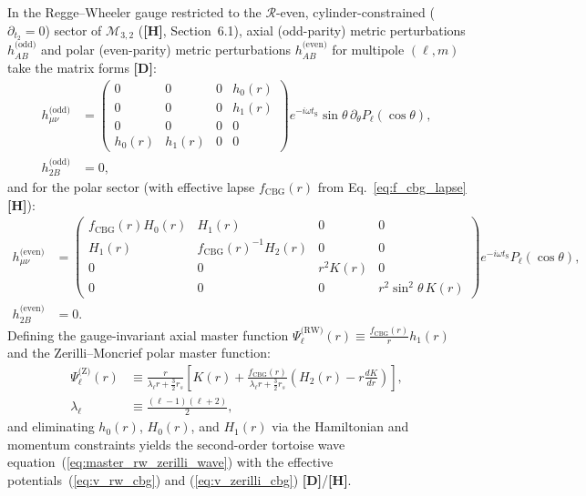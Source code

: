 \documentclass[11pt,a4paper]{article}
\newcommand{\catD}{\textbf{\textcolor{blue!75!black}{[D]}}}
\newcommand{\catH}{\textbf{\textcolor{orange!85!black}{[H]}}}
\theoremstyle{plain}
\theoremstyle{definition}
\theoremstyle{remark}
\numberwithin{equation}{section}
\begin{document}
In the Regge--Wheeler gauge \cite{regge1957,zerilli1970} restricted to the $\mathcal{R}$-even, cylinder-constrained ($\partial_{t_2} = 0$) sector of $\mathcal{M}_{3,2}$ (\catH, Section~6.1), axial (odd-parity) metric perturbations $h_{AB}^{\text{(odd)}}$ and polar (even-parity) metric perturbations $h_{AB}^{\text{(even)}}$ for multipole $(\ell, m)$ take the matrix forms \catD:
\begin{align}
h_{\mu\nu}^{\text{(odd)}} &= \begin{pmatrix}
0 & 0 & 0 & h_0(r) \\
0 & 0 & 0 & h_1(r) \\
0 & 0 & 0 & 0 \\
h_0(r) & h_1(r) & 0 & 0
\end{pmatrix} e^{-i\omega t_{\text{S}}} \sin\theta\,\partial_\theta P_\ell(\cos\theta), \nonumber \\[3pt]
h_{2B}^{\text{(odd)}} &= 0,
\label{eq:app_odd_matrix}
\end{align}
and for the polar sector (with effective lapse $f_{\text{CBG}}(r)$ from Eq.~\ref{eq:f_cbg_lapse} \catH):
\begin{align}
h_{\mu\nu}^{\text{(even)}} &= \begin{pmatrix}
f_{\text{CBG}}(r) H_0(r) & H_1(r) & 0 & 0 \\
H_1(r) & f_{\text{CBG}}(r)^{-1} H_2(r) & 0 & 0 \\
0 & 0 & r^2 K(r) & 0 \\
0 & 0 & 0 & r^2\sin^2\theta\,K(r)
\end{pmatrix} e^{-i\omega t_{\text{S}}} P_\ell(\cos\theta), \nonumber \\[3pt]
h_{2B}^{\text{(even)}} &= 0.
\label{eq:app_even_matrix}
\end{align}
Defining the gauge-invariant axial master function $\Psi_{\ell}^{\text{(RW)}}(r) \equiv \frac{f_{\text{CBG}}(r)}{r} h_1(r)$ and the Zerilli--Moncrief polar master function:
\begin{align}
\Psi_{\ell}^{\text{(Z)}}(r) &\equiv \frac{r}{\lambda_{\ell} r + \frac{3}{2}r_s} \left[ K(r) + \frac{f_{\text{CBG}}(r)}{\lambda_{\ell} r + \frac{3}{2}r_s} \left( H_2(r) - r\frac{dK}{dr} \right) \right], \nonumber \\[3pt]
\lambda_{\ell} &\equiv \frac{(\ell-1)(\ell+2)}{2},
\label{eq:app_zerilli_moncrief}
\end{align}
and eliminating $h_0(r)$, $H_0(r)$, and $H_1(r)$ via the Hamiltonian and momentum constraints yields the second-order tortoise wave equation~(\ref{eq:master_rw_zerilli_wave}) with the effective potentials~(\ref{eq:v_rw_cbg}) and (\ref{eq:v_zerilli_cbg}) \catD/\catH.
\end{document}
